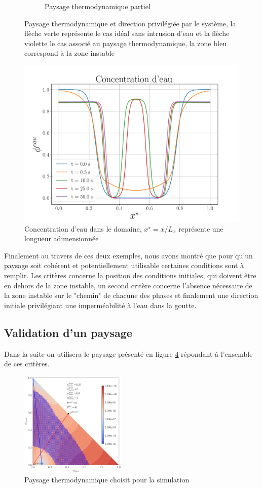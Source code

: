 \begin{figure}[H]
\begin{subfigure}[H]{0.45\textwidth}
 		\caption{Paysage thermodynamique partiel}
 		\label{fig:y equals x}
 	\end{subfigure}
 	\caption{Paysage thermodynamique et direction privilégiée par le système, la flèche verte représente le cas idéal sans intrusion d'eau et la flèche violette le cas associé au paysage thermodynamique, la zone bleu correspond à la zone instable}
 	\label{fig:paysage2}
 \end{figure}\vspace{-0.9cm}
 \begin{figure}[H]
 	\centering
 	\includegraphics[width=0.7\linewidth]{figure/eau_ref}
 	\caption[Concentration d'eau dans le domaine]{Concentration d'eau dans le domaine, $x^{\star} = x / L_x$ représente une longueur adimensionnée}
 	\label{fig:eauref}
 \end{figure}\vspace{-0.7cm}
Finalement au travers de ces deux exemples, nous avons montré que pour qu'un paysage soit cohérent et potentiellement utilisable certaines conditions sont à remplir. Les critères concerne la position des conditions initiales, qui doivent être en dehors de la zone instable, un second critère concerne l'absence nécessaire de la zone instable sur le "chemin" de chacune des phases et finalement une direction initiale privilégiant une imperméabilité à l'eau dans la goutte.
\subsection{Validation d'un paysage}
Dans la suite on utilisera le paysage présenté en figure \ref{fig:thechoosenone} répondant à l'ensemble de ces critères.
\begin{figure}[H]
		\centering
		\includegraphics[width=0.45\textwidth]{figure/Paysage_ecriture1.png}
	\caption{Paysage thermodynamique choisit pour la simulation}
	\label{fig:thechoosenone}
\end{figure}


